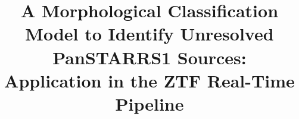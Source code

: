 \documentclass[twocolumn, dvipdfmx]{aastex62}
\begin{document}
\begin{CJK*}{UTF8}{gbsn}

\title{A Morphological Classification Model to Identify Unresolved 
       PanSTARRS1 Sources: \\
       Application in the ZTF Real-Time Pipeline
       }




\end{CJK*}
\end{document}
